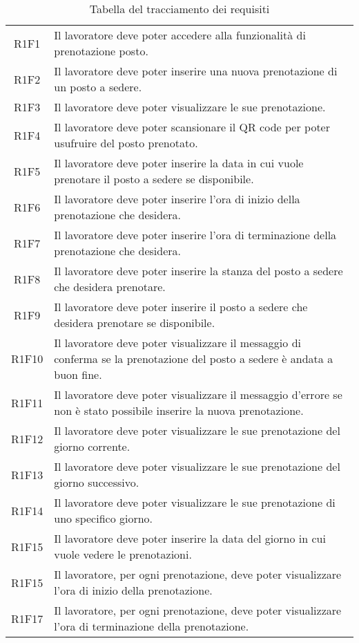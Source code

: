 \begin{table}[h]%
	\centering
	\begin{tabularx}{\textwidth}{|c|X|}
		\hline	
		\rowcolor{giallo}
		\intest{Codice} &  \intest{Descrizione} \\	
		\hline			
		R1F1 & Il lavoratore deve poter accedere alla funzionalità di prenotazione posto.\\
		R1F2 & Il lavoratore deve poter inserire una nuova prenotazione di un posto a sedere.\\
		R1F3 & Il lavoratore deve poter visualizzare le sue prenotazione.\\
		R1F4 & Il lavoratore deve poter scansionare il QR code per poter usufruire del posto prenotato.\\
		R1F5 & Il lavoratore deve poter inserire la data in cui vuole prenotare il posto a sedere se disponibile.\\
		R1F6 & Il lavoratore deve poter inserire l'ora di inizio della prenotazione che desidera.\\
		R1F7 & Il lavoratore deve poter inserire l'ora di terminazione della prenotazione che desidera.\\
		R1F8 & Il lavoratore deve poter inserire la stanza del posto a sedere che desidera prenotare.\\
		R1F9 & Il lavoratore deve poter inserire il posto a sedere che desidera prenotare se disponibile.\\
		R1F10 & Il lavoratore deve poter visualizzare il messaggio di conferma se la prenotazione del posto a sedere è andata a buon fine.\\
		R1F11 & Il lavoratore deve poter visualizzare il messaggio d'errore se non è stato possibile inserire la nuova prenotazione.\\
		R1F12 & Il lavoratore deve poter visualizzare le sue prenotazione del giorno corrente.\\
		R1F13 & Il lavoratore deve poter visualizzare le sue prenotazione del giorno successivo.\\
		R1F14 & Il lavoratore deve poter visualizzare le sue prenotazione di uno specifico giorno.\\
		R1F15 & Il lavoratore deve poter inserire la data del giorno in cui vuole vedere le prenotazioni.\\
		R1F15 & Il lavoratore, per ogni prenotazione, deve poter visualizzare l'ora di inizio della prenotazione.\\
		R1F17 & Il lavoratore, per ogni prenotazione, deve poter visualizzare l'ora di terminazione della prenotazione.\\	
	\hline	
	\end{tabularx} \hbox{}
\caption{Tabella del tracciamento dei requisiti}
\end{table}%
\\

